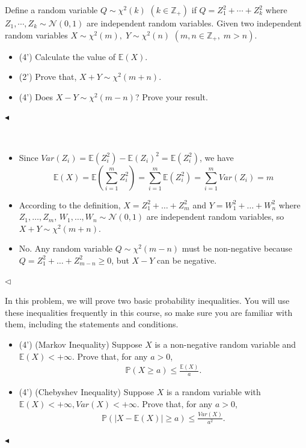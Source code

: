 \documentclass[11pt]{article}
\newenvironment{problem}[2][Problem]{\begin{trivlist}
\item[\hskip \labelsep {\bfseries #1}\hskip \labelsep {\bfseries #2.}]}{\hfill$\blacktriangleleft$\end{trivlist}}
\newenvironment{answer}[1][Answer]{\begin{trivlist}
\item[\hskip \labelsep {\bfseries #1.}\hskip \labelsep]}{\hfill$\lhd$\end{trivlist}}
\newcommand\E{\mathbb{E}}
\begin{document}
\begin{problem}{2 (10')}
Define a random variable $Q \sim \chi^2(k)$ $(k\in\mathbb{Z}_+)$ if $Q=Z_1^2+\cdots+Z_k^2$ where $Z_1,\cdots,Z_k \sim \mathcal{N}(0,1)$ are independent random variables. Given two independent random variables $X\sim\chi^2(m),\;Y\sim\chi^2(n)$ $(m,n\in\mathbb{Z}_+,\;m > n)$.
\begin{itemize}
    \item [(1)] (4') Calculate the value of $\mathbb{E}(X)$.
    \item [(2)] (2') Prove that, $X + Y \sim \chi^2(m + n)$.
    \item [(3)] (4') Does $X - Y \sim \chi^2(m - n)$? Prove your result.
\end{itemize}
\end{problem}

\begin{answer} ~
\begin{itemize}
    \item [(1)] Since $Var(Z_i) = \E(Z_i^2) - \E(Z_i)^2 = \E(Z_i^2)$, we have \[\E(X) = \E\left(\sum_{i=1}^m Z_i^2\right) = \sum_{i=1}^m \E(Z_i^2) = \sum_{i=1}^m Var(Z_i) = m\]
    \item [(2)] According to the definition, $X = Z_1^2 + \dots + Z_m^2$ and $Y = W_1^2 + \dots + W_n^2$ where $Z_1, \dots, Z_m$, $W_1, \dots, W_n \sim \mathcal{N}(0, 1)$ are independent random variables, so $X + Y \sim \chi^2(m + n)$.
    \item [(3)] No. Any random variable $Q \sim \chi^2(m - n)$ must be non-negative because $Q = Z_1^2 + \dots + Z_{m - n}^2 \ge 0$, but $X - Y$ can be negative.
\end{itemize}
\end{answer}



\begin{problem}{3 (8')} In this problem, we will prove two basic probability inequalities. You will use these inequalities frequently in this course, so make sure you are familiar with them, including the statements and conditions.
\begin{itemize}
    \item [(1)] (4') (Markov Inequality) Suppose $X$ is a non-negative random variable and $\mathbb{E}(X)<+\infty$. Prove that, for any $a>0$,
    \begin{align*}
        \mathbb{P}(X\geq a)\leq\frac{\mathbb{E}(X)}{a}.
    \end{align*}
    \item [(2)] (4') (Chebyshev Inequality) Suppose $X$ is a random variable with $\mathbb{E}(X)<+\infty, Var(X)<+\infty$. Prove that, for any $a>0$,
    \begin{align*}
        \mathbb{P}(|X-\mathbb{E}(X)|\geq a)\leq\frac{Var(X)}{a^2}.
    \end{align*}
\end{itemize}
\end{problem}
\end{document}
